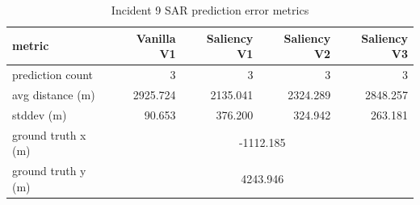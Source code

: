 \begin{table}[ht]
\centering
\caption{Incident 9 SAR prediction error metrics}
\label{tab:sar-incident-9}
\begin{tabular}{lrrrr}
\hline
metric & Vanilla V1 & Saliency V1 & Saliency V2 & Saliency V3 \\
\hline
prediction count & 3 & 3 & 3 & 3 \\
avg distance (m) & 2925.724 & 2135.041 & 2324.289 & 2848.257 \\
stddev (m) & 90.653 & 376.200 & 324.942 & 263.181 \\
ground truth x (m) & \multicolumn{4}{c}{-1112.185} \\
ground truth y (m) & \multicolumn{4}{c}{4243.946} \\
\hline
\end{tabular}
\end{table}
